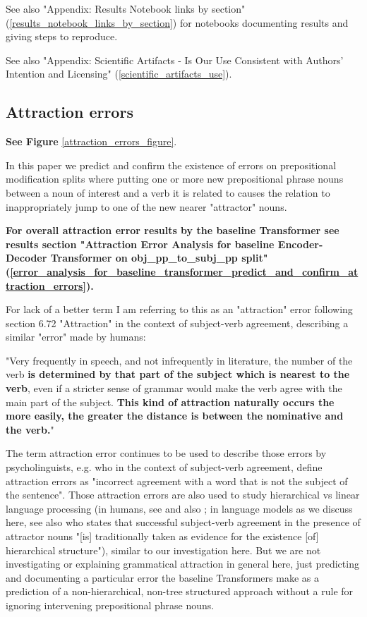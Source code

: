 \documentclass[11pt]{article}
\begin{document}
See also "Appendix: Results Notebook links by section" (\ref{results_notebook_links_by_section}) for notebooks documenting results and giving steps to reproduce.

See also "Appendix: Scientific Artifacts - Is Our Use Consistent with Authors' Intention and Licensing" (\ref{scientific_artifacts_use}).

\subsection{Attraction errors}
\label{attraction_errors}

\textbf{See Figure} \ref{attraction_errors_figure}.

In this paper we predict and confirm the existence of errors on prepositional modification splits where putting one or more new prepositional phrase nouns between a noun of interest and a verb it is related to causes the relation to inappropriately jump to one of the new nearer "attractor" nouns. 

\textbf{For overall attraction error results by the baseline Transformer see results section "Attraction Error Analysis for \cite{Wu2023} baseline Encoder-Decoder Transformer on obj\_pp\_to\_subj\_pp split" (\ref{error_analysis_for_baseline_transformer_predict_and_confirm_attraction_errors}).}

For lack of a better term I am referring to this as an "attraction" error following \cite{jespersen1913modernenglishgrammar1954reprint} section 6.72 "Attraction" in the context of subject-verb agreement, describing a similar "error" made by humans:

"Very frequently in speech, and not infrequently in
literature, the number of the verb \textbf{is determined by
that part of the subject which is nearest to the verb},
even if a stricter sense of grammar would make
the verb agree with the main part of the subject.
\textbf{This kind of attraction naturally occurs the more easily, the greater the distance is between the nominative and the verb.}"

The term attraction error continues to be used to describe those errors by psycholinguists, e.g. \cite{FRANCK2006173} who in the context of subject-verb agreement, define attraction errors as "incorrect agreement with a word that is not the subject of the sentence".
Those attraction errors are also used to study hierarchical vs linear language processing (in humans, see \cite{FRANCK2006173} and also \cite{VIGLIOCCO1998B13}; in language models as we discuss here, see also \cite{goldberg2019assessingbertssyntacticabilities} who states that successful subject-verb agreement in the presence of attractor nouns  "[is] traditionally taken as evidence for the existence [of] hierarchical structure"), similar to our investigation here. But we are not investigating or explaining grammatical attraction in general here, just predicting and documenting a particular error the baseline Transformers make as a prediction of a non-hierarchical, non-tree structured approach without a rule for ignoring intervening prepositional phrase nouns.
\end{document}
